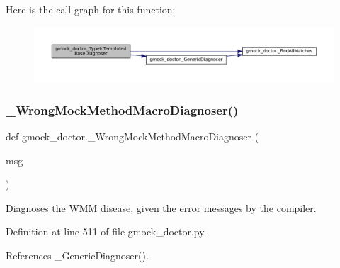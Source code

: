 Here is the call graph for this function\+:
\nopagebreak
\begin{figure}[H]
\begin{center}
\leavevmode
\includegraphics[width=350pt]{namespacegmock__doctor_ac4e4908d4e43ef87f522365e99ec36c8_cgraph}
\end{center}
\end{figure}
\mbox{\label{namespacegmock__doctor_a430611c0e038abaa33ae320b7118779b}} 
\subsubsection{\texorpdfstring{\+\_\+\+Wrong\+Mock\+Method\+Macro\+Diagnoser()}{\_WrongMockMethodMacroDiagnoser()}}
{\footnotesize\ttfamily def gmock\+\_\+doctor.\+\_\+\+Wrong\+Mock\+Method\+Macro\+Diagnoser (\begin{DoxyParamCaption}\item[{}]{msg }\end{DoxyParamCaption})\hspace{0.3cm}{\ttfamily [private]}}

\begin{DoxyVerb}Diagnoses the WMM disease, given the error messages by the compiler.\end{DoxyVerb}
 

Definition at line 511 of file gmock\+\_\+doctor.\+py.



References \+\_\+\+Generic\+Diagnoser().


